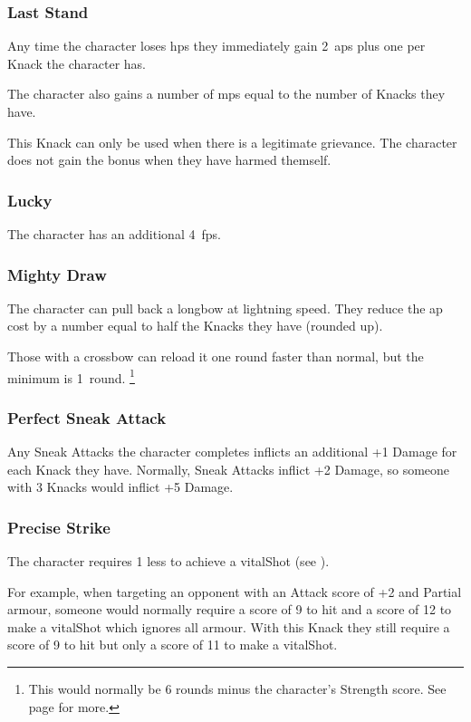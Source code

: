 \begin{multicols}{2}
\subsubsection{Last Stand}

Any time the character loses \glspl{hp} they immediately gain 2~\glspl{ap} plus one per Knack the character has.

The character also gains a number of \glspl{mp} equal to the number of Knacks they have.

This Knack can only be used when there is a legitimate grievance.
The character does not gain the bonus when they have harmed themself.

\subsubsection{Lucky}

The character has an additional 4~\glspl{fp}.

\subsubsection{Mighty Draw}

The character can pull back a longbow at lightning speed.
They reduce the \gls{ap} cost by a number equal to half the Knacks they have (rounded up).

Those with a crossbow can reload it one round faster than normal, but the minimum is 1~round.%
\footnote{This would normally be 6 rounds minus the character's Strength score. See page \pageref{crossbow} for more.}

\subsubsection{Perfect Sneak Attack}

Any Sneak Attacks the character completes inflicts an additional +1 Damage for each Knack they have.
Normally, Sneak Attacks inflict +2 Damage, so someone with 3 Knacks would inflict +5 Damage.

\subsubsection{Precise Strike}\label{precisestrike}

The character requires 1 less to achieve a \gls{vitalShot} (see ).

\begin{exampletext}
  For example, when targeting an opponent with an Attack score of +2 and Partial armour, someone would normally require a score of 9 to hit and a score of 12 to make a \gls{vitalShot} which ignores all armour.
  With this Knack they still require a score of 9 to hit but only a score of 11 to make a \gls{vitalShot}.
\end{exampletext}


\end{multicols}
